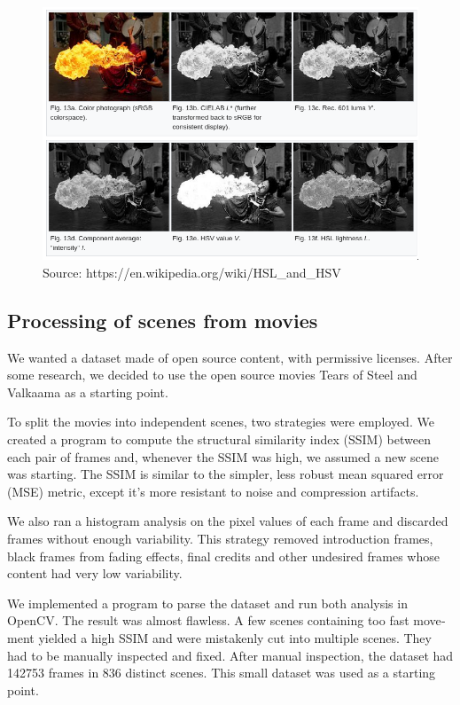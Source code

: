 \documentclass[12pt,openright,twoside,a4paper,english]{abntex2}
\begin{document}
\begin{otherlanguage}{english}
\begin{figure}[!htb]
\centering
\includegraphics[width=\textwidth]{Colorspaces}
\caption{Source: https://en.wikipedia.org/wiki/HSL\_and\_HSV }
\label{hsl_hsv}
\end{figure}

\subsection{Processing of scenes from movies}

We wanted a dataset made of open source content, with permissive licenses. After some research, we decided to use the open source movies Tears of Steel and Valkaama as a starting point. %

To split the movies into independent scenes, two strategies were employed. We created a program to compute the structural similarity index (SSIM) between each pair of frames and, whenever the SSIM was high, we assumed a new scene was starting. The SSIM is similar to the simpler, less robust mean squared error (MSE) metric, except it's more resistant to noise and compression artifacts.

We also ran a histogram analysis on the pixel values of each frame and discarded frames without enough variability. This strategy removed introduction frames, black frames from fading effects, final credits and other undesired frames whose content had very low variability.

We implemented a program to parse the dataset and run both analysis in OpenCV. The result was almost flawless. A few scenes containing too fast movement yielded a high SSIM and were mistakenly cut into multiple scenes. They had to be manually inspected and fixed. After manual inspection, the dataset had 142753 frames in 836 distinct scenes. This small dataset was used as a starting point.


\end{otherlanguage}
\end{document}
